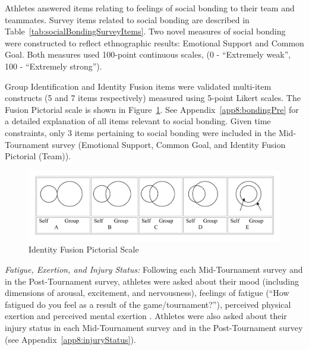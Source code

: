 \begin{CJK}{UTF8}{gbsn}
Athletes answered items relating to feelings of social bonding to their team and teammates.  Survey items related to social bonding are described in Table~\ref{tab:socialBondingSurveyItems}. Two novel measures of social bonding were constructed to reflect ethnographic results: Emotional Support and Common Goal.  Both measures used 100-point continuous scales, (0 - ``Extremely weak'', 100 - ``Extremely strong'').

Group Identification and Identity Fusion items were validated multi-item constructs (5 and 7 items respectively) measured using 5-point Likert scales. The Fusion Pictorial scale is shown in Figure~\ref{fig:fusionPictorialGroup}.  See Appendix~\ref{app8:bondingPre} for a detailed explanation of all items relevant to social bonding.  Given time constraints, only 3 items pertaining to social bonding were included in the Mid-Tournament survey (Emotional Support, Common Goal, and Identity Fusion Pictorial (Team)).




\begin{figure}[htbp]
  \includegraphics[width=\linewidth]{images/Identity_Fusion_Pictorial_Scale.png}
  \caption{Identity Fusion Pictorial Scale}
  \label{fig:fusionPictorialGroup}
\end{figure}




\textit{Fatigue, Exertion, and Injury Status:} Following each Mid-Tournament survey and in the Post-Tournament survey, athletes were asked about their mood (including dimensions of arousal, excitement, and nervousness), feelings of fatigue (``How fatigued do you feel as a result of the game/tournament?''), perceived physical exertion \citep[Borg RPE scale;][]{Borg1990} and perceived mental exertion \citep[see][]{Noakes2012a}. Athletes were also asked about their injury status in each Mid-Tournament survey and in the Post-Tournament survey (see Appendix~\ref{app8:injuryStatus}).


\end{CJK}
